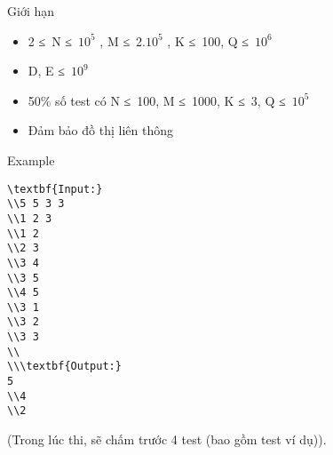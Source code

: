 Giới hạn  
\begin{itemize}
	\item     2 ≤ N ≤ $10^{5}$    , M ≤ 2.$10^{5}$    , K ≤ 100, Q ≤ $10^{6}$
	\item     D, E ≤ $10^{9}$
	\item     50\% số test có N ≤ 100, M ≤ 1000, K ≤ 3, Q ≤ $10^{5}$
	\item     Đảm bảo đồ thị liên thông   
\end{itemize}
   Example  
\begin{verbatim}
\textbf{Input:}
\\5 5 3 3
\\1 2 3
\\1 2
\\2 3
\\3 4
\\3 5
\\4 5
\\3 1
\\3 2
\\3 3
\\
\\\textbf{Output:}
5
\\4
\\2\end{verbatim}

(Trong lúc thi, sẽ chấm trước 4 test (bao gồm test ví dụ)).